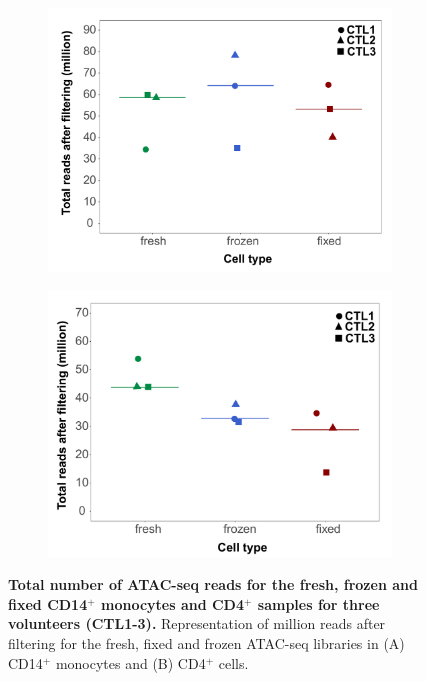 \begin{figure}[htbp]
\centering
\begin{subfigure}{0.5\textwidth}
\centering
\includegraphics[width=\textwidth]{./Results1/pdfs/Core_ATAC_CD14_fresh_frozen_fixed_filtered_total_reads}
\caption{\textbf{}}
\end{subfigure}%
\begin{subfigure}{0.5\textwidth}
\centering
\includegraphics[width=\textwidth]{./Results1/pdfs/Core_ATAC_CD4_fresh_frozen_fixed_filtered_total_reads}
\caption{\textbf{}}
\end{subfigure}
\caption[Total number of ATAC-seq reads for the fresh, frozen and fixed CD14$^+$ monocytes and CD4$^+$ samples for three volunteers (CTL1-3).]{\textbf{Total number of ATAC-seq reads for the fresh, frozen and fixed CD14$^+$ monocytes and CD4$^+$ samples for three volunteers (CTL1-3).} Representation of million reads after filtering for the fresh, fixed and frozen ATAC-seq libraries in (A) CD14$^+$ monocytes and (B) CD4$^+$ cells.}
\label{figure:Core_ATAC_all_conditions_total_reads}
\end{figure} 

